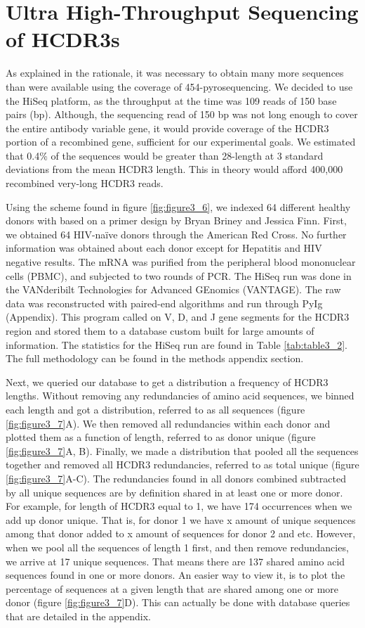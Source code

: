 \section{Ultra High-Throughput Sequencing of HCDR3s}
As explained in the rationale, it was necessary to obtain many more sequences than were available using the coverage of 454-pyrosequencing. We decided to use the HiSeq platform, as the throughput at the time was 109 reads of 150 base pairs (bp). Although, the sequencing read of 150 bp was not long enough to cover the entire antibody variable gene, it would provide coverage of the HCDR3 portion of a recombined gene, sufficient for our experimental goals. We estimated that 0.4\% of the sequences would be greater than 28-length at 3 standard deviations from the mean HCDR3 length. This in theory would afford 400,000 recombined very-long HCDR3 reads.

Using the scheme found in figure \ref{fig:figure3_6}, we indexed 64 different healthy donors with based on a primer design by Bryan Briney and Jessica Finn. First, we obtained 64 HIV-naïve donors through the American Red Cross. No further information was obtained about each donor except for Hepatitis and HIV negative results. The mRNA was purified from the peripheral blood mononuclear cells (PBMC), and subjected to two rounds of PCR. The HiSeq run was done in the VANderibilt Technologies for Advanced GEnomics (VANTAGE). The raw data was reconstructed with paired-end algorithms and run through PyIg (Appendix). This program called on V, D, and J gene segments for the HCDR3 region and stored them to a database custom built for large amounts of information. The statistics for the HiSeq run are found in Table \ref{tab:table3_2}.  The full methodology can be found in the methods appendix section.

Next, we queried our database to get a distribution a frequency of HCDR3 lengths. Without removing any redundancies of amino acid sequences, we binned each length and got a distribution, referred to as all sequences (figure \ref{fig:figure3_7}A). We then removed all redundancies within each donor and plotted them as a function of length, referred to as donor unique (figure \ref{fig:figure3_7}A, B). Finally, we made a distribution that pooled all the sequences together and removed all HCDR3 redundancies, referred to as total unique (figure \ref{fig:figure3_7}A-C). The redundancies found in all donors combined subtracted by all unique sequences are by definition shared in at least one or more donor. For example, for length of HCDR3 equal to 1, we have 174 occurrences when we add up donor unique. That is, for donor 1 we have x amount of unique sequences among that donor added to x amount of sequences for donor 2 and etc. However, when we pool all the sequences of length 1 first, and then remove redundancies, we arrive at 17 unique sequences. That means there are 137 shared amino acid sequences found in one or more donors. An easier way to view it, is to plot the percentage of sequences at a given length that are shared among one or more donor (figure \ref{fig:figure3_7}D). This can actually be done with database queries that are detailed in the appendix.

